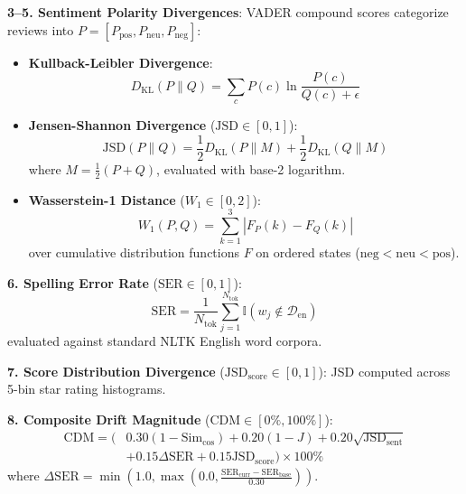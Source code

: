 \documentclass[conference]{IEEEtran}
\begin{document}
\textbf{3--5. Sentiment Polarity Divergences}: VADER compound scores categorize reviews into $P = [P_{\text{pos}}, P_{\text{neu}}, P_{\text{neg}}]$:
\begin{itemize}
    \item \textbf{Kullback-Leibler Divergence}:
    \begin{equation}
    D_{\text{KL}}(P \parallel Q) = \sum_{c} P(c) \ln \frac{P(c)}{Q(c) + \epsilon}
    \end{equation}
    \item \textbf{Jensen-Shannon Divergence} ($\text{JSD} \in [0, 1]$):
    \begin{equation}
    \text{JSD}(P \parallel Q) = \frac{1}{2} D_{\text{KL}}(P \parallel M) + \frac{1}{2} D_{\text{KL}}(Q \parallel M)
    \end{equation}
    where $M = \frac{1}{2}(P + Q)$, evaluated with base-2 logarithm.
    \item \textbf{Wasserstein-1 Distance} ($W_1 \in [0, 2]$):
    \begin{equation}
    W_1(P, Q) = \sum_{k=1}^{3} |F_P(k) - F_Q(k)|
    \end{equation}
    over cumulative distribution functions $F$ on ordered states ($\text{neg} < \text{neu} < \text{pos}$).
\end{itemize}

\textbf{6. Spelling Error Rate} ($\text{SER} \in [0, 1]$):
\begin{equation}
\text{SER} = \frac{1}{N_{\text{tok}}} \sum_{j=1}^{N_{\text{tok}}} \mathbb{I}(w_j \notin \mathcal{D}_{\text{en}})
\end{equation}
evaluated against standard NLTK English word corpora.

\textbf{7. Score Distribution Divergence} ($\text{JSD}_{\text{score}} \in [0, 1]$): JSD computed across 5-bin star rating histograms.

\textbf{8. Composite Drift Magnitude} ($\text{CDM} \in [0\%, 100\%]$):
\begin{align}
\text{CDM} = \big(&0.30(1 - \text{Sim}_{\text{cos}}) + 0.20(1 - J) + 0.20\sqrt{\text{JSD}_{\text{sent}}} \nonumber \\
&+ 0.15\Delta\text{SER} + 0.15\text{JSD}_{\text{score}}\big) \times 100\%
\end{align}
where $\Delta\text{SER} = \min(1.0, \max(0.0, \frac{\text{SER}_{\text{curr}} - \text{SER}_{\text{base}}}{0.30}))$.
\end{document}
